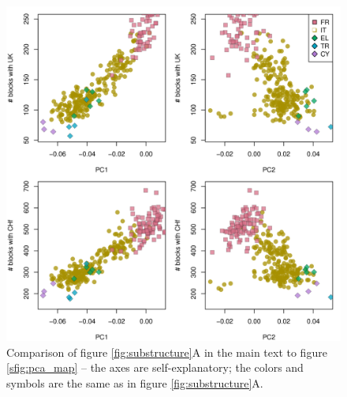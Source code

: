 \documentclass{article}
\begin{document}
\begin{figure}[!htp]
  \begin{center}
    \includegraphics{Italy_PCA_vs_IBD}
    \caption{
    Comparison of figure \ref{fig:substructure}A in the main text to figure \ref{sfig:pca_map} --
    the axes are self-explanatory; the colors and symbols are the same as in figure \ref{fig:substructure}A.
    \label{sfig:pca_ibd_it}
    }
  \end{center}
\end{figure}
\end{document}
